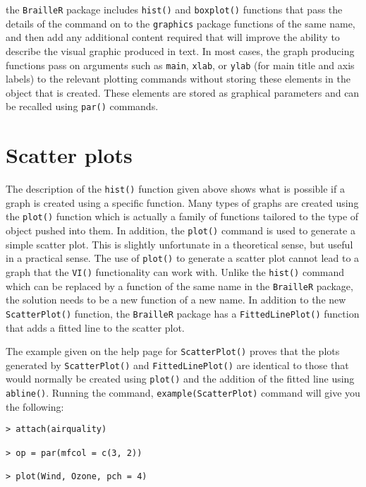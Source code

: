 \documentclass[
]{book}
\begin{document}
the \texttt{BrailleR} package includes \texttt{hist()} and \texttt{boxplot()} functions that pass the details of the command on to the \texttt{graphics} package functions of the same name, and then add any additional content required that will improve the ability to describe the visual graphic produced in text. In most cases, the graph producing functions pass on arguments such as \texttt{main}, \texttt{xlab}, or \texttt{ylab} (for main title and axis labels) to the relevant plotting commands without storing these elements in the object that is created. These elements are stored as graphical parameters and can be recalled using \texttt{par()} commands.

\hypertarget{scatter-plots}{%
\section{Scatter plots}\label{scatter-plots}}

The description of the \texttt{hist()} function given above shows what is possible if a graph is created using a specific function. Many types of graphs are created using the \texttt{plot()} function which is actually a family of functions tailored to the type of object pushed into them. In addition, the \texttt{plot()} command is used to generate a simple scatter plot. This is slightly unfortunate in a theoretical sense, but useful in a practical sense. The use of \texttt{plot()} to generate a scatter plot cannot lead to a graph that the \texttt{VI()} functionality can work with. Unlike the \texttt{hist()} command which can be replaced by a function of the same name in the \texttt{BrailleR} package, the solution needs to be a new function of a new name. In addition to the new \texttt{ScatterPlot()} function, the \texttt{BrailleR} package has a \texttt{FittedLinePlot()} function that adds a fitted line to the scatter plot.

The example given on the help page for \texttt{ScatterPlot()} proves that the plots generated by \texttt{ScatterPlot()} and \texttt{FittedLinePlot()} are identical to those that would normally be created using \texttt{plot()} and the addition of the fitted line using \texttt{abline()}. Running the command, \texttt{example(ScatterPlot)} command will give you the following:

\begin{verbatim}
> attach(airquality)

> op = par(mfcol = c(3, 2))

> plot(Wind, Ozone, pch = 4)
\end{verbatim}
\end{document}
